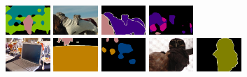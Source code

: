 \begin{figure}[h]
	\includegraphics[width=0.15\textwidth]{demo_images/result/error/p_2007_002539.png}
	\quad
	\includegraphics[width=0.15\textwidth]{demo_images/result/error/2007_008964.jpg}
	\includegraphics[width=0.15\textwidth]{demo_images/result/error/2007_008964.png}
	\includegraphics[width=0.15\textwidth]{demo_images/result/error/p_2007_008964.png}
	\\
	\includegraphics[width=0.15\textwidth]{demo_images/result/error/2008_000763.jpg}
	\includegraphics[width=0.15\textwidth]{demo_images/result/error/2008_000763.png}
	\includegraphics[width=0.15\textwidth]{demo_images/result/error/p_2008_000763.png}
	\quad
	\includegraphics[width=0.15\textwidth]{demo_images/result/error/2007_009088.jpg}
	\includegraphics[width=0.15\textwidth]{demo_images/result/error/2007_009088.png}

\end{figure}
